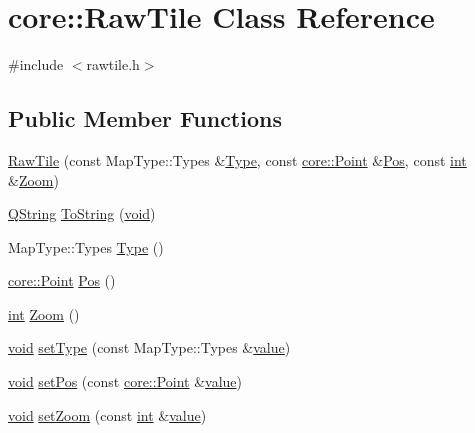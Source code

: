 \hypertarget{classcore_1_1_raw_tile}{\section{core\-:\-:Raw\-Tile Class Reference}
\label{classcore_1_1_raw_tile}
}


{\ttfamily \#include $<$rawtile.\-h$>$}

\subsection*{Public Member Functions}
\begin{DoxyCompactItemize}
\item 
\hyperlink{group___o_p_map_widget_ga6ea25b848193120014a2b04afbdf8913}{Raw\-Tile} (const Map\-Type\-::\-Types \&\hyperlink{group___o_p_map_widget_gab7a1ec0019fc105d9691bb2f0465f6b1}{Type}, const \hyperlink{structcore_1_1_point}{core\-::\-Point} \&\hyperlink{deflate_8h_a80a8610ae675eaeead82013bacde10a1}{Pos}, const \hyperlink{ioapi_8h_a787fa3cf048117ba7123753c1e74fcd6}{int} \&\hyperlink{group___o_p_map_widget_gabd1ed75e92f807c70de10034d9d5dda4}{Zoom})
\item 
\hyperlink{group___u_a_v_objects_plugin_gab9d252f49c333c94a72f97ce3105a32d}{Q\-String} \hyperlink{group___o_p_map_widget_gaf820aab5311f0f43e2e64399dcb65ef7}{To\-String} (\hyperlink{group___u_a_v_objects_plugin_ga444cf2ff3f0ecbe028adce838d373f5c}{void})
\item 
Map\-Type\-::\-Types \hyperlink{group___o_p_map_widget_gab7a1ec0019fc105d9691bb2f0465f6b1}{Type} ()
\item 
\hyperlink{structcore_1_1_point}{core\-::\-Point} \hyperlink{group___o_p_map_widget_ga1c62f80ba95a32840e72ccfa745f503f}{Pos} ()
\item 
\hyperlink{ioapi_8h_a787fa3cf048117ba7123753c1e74fcd6}{int} \hyperlink{group___o_p_map_widget_gabd1ed75e92f807c70de10034d9d5dda4}{Zoom} ()
\item 
\hyperlink{group___u_a_v_objects_plugin_ga444cf2ff3f0ecbe028adce838d373f5c}{void} \hyperlink{group___o_p_map_widget_gaa1c1e525ae0bd6aa39e0d3535cb696c8}{set\-Type} (const Map\-Type\-::\-Types \&\hyperlink{glext_8h_aa0e2e9cea7f208d28acda0480144beb0}{value})
\item 
\hyperlink{group___u_a_v_objects_plugin_ga444cf2ff3f0ecbe028adce838d373f5c}{void} \hyperlink{group___o_p_map_widget_ga1c6d9581bee67f1fd163df34471594da}{set\-Pos} (const \hyperlink{structcore_1_1_point}{core\-::\-Point} \&\hyperlink{glext_8h_aa0e2e9cea7f208d28acda0480144beb0}{value})
\item 
\hyperlink{group___u_a_v_objects_plugin_ga444cf2ff3f0ecbe028adce838d373f5c}{void} \hyperlink{group___o_p_map_widget_ga74673bcbb15e8d7c09ef6e909d40a813}{set\-Zoom} (const \hyperlink{ioapi_8h_a787fa3cf048117ba7123753c1e74fcd6}{int} \&\hyperlink{glext_8h_aa0e2e9cea7f208d28acda0480144beb0}{value})
\end{DoxyCompactItemize}
